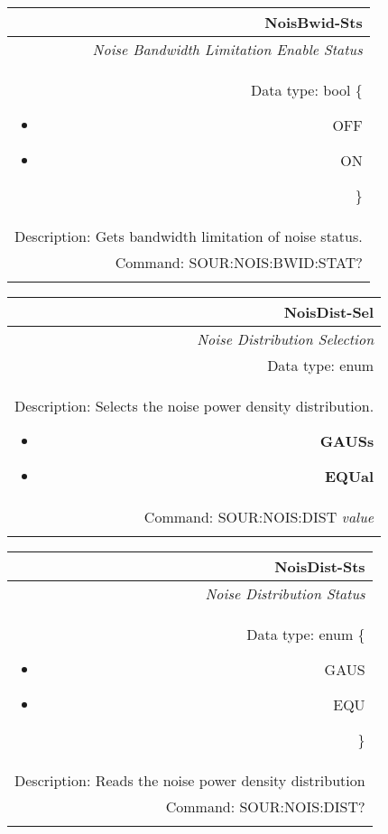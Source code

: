 \documentclass[openany]{article}
\begin{document}
		\begin{tabular}{N}
			\hline
			\bfseries NoisBwid-Sts \\ \hline
			\emph{Noise Bandwidth Limitation Enable Status} \\
			Data type: bool \{\begin{itemize}[noitemsep]
				\small
				\item[] OFF
				\item[] ON
			\end{itemize}\} \\
			Description: Gets bandwidth limitation of noise status. \\
			Command: SOUR:NOIS:BWID:STAT? \\
			\\
			
		\end{tabular}


		\begin{tabular}{N}
			\hline
			\bfseries NoisDist-Sel \\ \hline
			\emph{Noise Distribution Selection} \\
			Data type: enum \\   
			Description: Selects the noise power density distribution.\begin{itemize}[noitemsep]
				\small
				\item[] \textbf{GAUSs}
                                \item[] \textbf{EQUal}

			\end{itemize} \\
			Command: SOUR:NOIS:DIST \emph{value} \\
			\\

		\end{tabular}


		\begin{tabular}{N}
			\hline
			\bfseries NoisDist-Sts \\ \hline
			\emph{Noise Distribution Status} \\
			Data type: enum \{\begin{itemize}[noitemsep]
				\small
				\item[] GAUS
				\item[] EQU

			\end{itemize}\} \\ 
			Description: Reads the noise power density distribution \\
			Command: SOUR:NOIS:DIST? \\
			\\

		\end{tabular}
\end{document}
